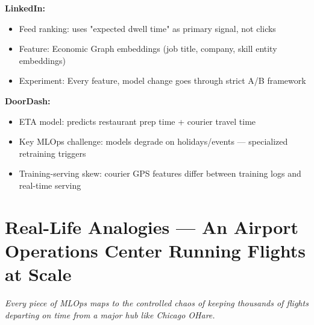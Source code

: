 \documentclass[11pt]{article}
\providecommand{\tightlist}{\setlength{\itemsep}{1pt}\setlength{\parskip}{0pt}}
\begin{document}
\textbf{LinkedIn:}

\begin{itemize}
\tightlist
\item
  Feed ranking: uses "expected dwell time" as primary signal, not clicks
\item
  Feature: Economic Graph embeddings (job title, company, skill entity embeddings)
\item
  Experiment: Every feature, model change goes through strict A/B framework
\end{itemize}

\textbf{DoorDash:}

\begin{itemize}
\tightlist
\item
  ETA model: predicts restaurant prep time + courier travel time
\item
  Key MLOps challenge: models degrade on holidays/events --- specialized retraining triggers
\item
  Training-serving skew: courier GPS features differ between training logs and real-time serving
\end{itemize}

\section{Real-Life Analogies --- An Airport Operations Center Running Flights at Scale}\label{real-life-analogies--an-airport-operations-center-running-flights-at-scale}

\emph{Every piece of MLOps maps to the controlled chaos of keeping thousands of flights departing on time from a major hub like Chicago O\textquotesingle Hare.}
\end{document}
